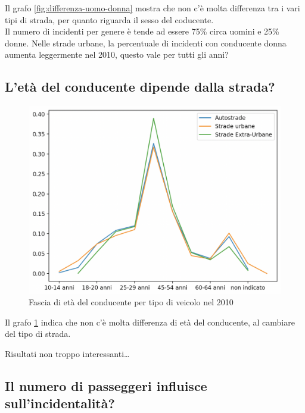 \documentclass[a4paper]{report}
\begin{document}
Il grafo \ref{fig:differenza-uomo-donna} mostra che non c'è molta differenza tra i vari tipi di 
strada, per quanto riguarda il sesso del coducente.\\
Il numero di incidenti per genere è tende ad essere 75\% circa uomini e 25\% donne.
Nelle strade  urbane, la percentuale di incidenti con conducente donna aumenta leggermente nel 2010, 
questo vale per tutti gli anni?


\subsection{L'età del conducente dipende dalla strada?}

\begin{figure}
    \includegraphics[width=\linewidth]{../src/incidenti/incidenti_senza_coords/tipo_veicoli/differenza_eta.png}
    \caption{Fascia di età del conducente per tipo di veicolo nel 2010}
    \label{fig:differenza-eta}
\end{figure}

Il grafo \ref{fig:differenza-eta} indica che non c'è molta differenza di età del conducente, 
al cambiare del tipo di strada.

Risultati non troppo interessanti\dots


\subsection{Il numero di passeggeri influisce sull'incidentalità?}
\end{document}
